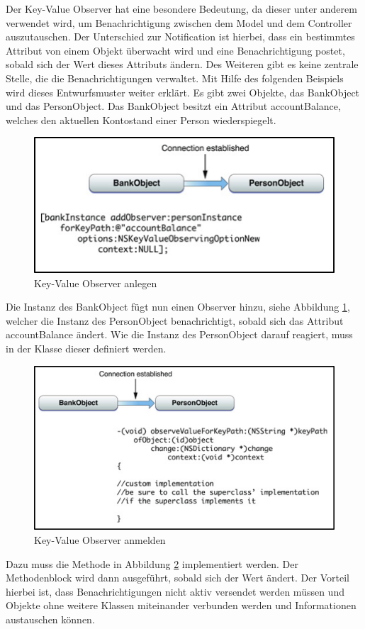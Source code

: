 \documentclass[11pt,a4paper]{report}
\begin{document}
Der Key-Value Observer hat eine besondere Bedeutung, da dieser unter anderem verwendet wird, um Benachrichtigung zwischen dem Model und dem Controller auszutauschen. Der Unterschied zur Notification ist hierbei, dass ein bestimmtes Attribut von einem Objekt überwacht wird und eine Benachrichtigung postet, sobald sich der Wert dieses Attributs ändern. Des Weiteren gibt es keine zentrale Stelle, die die Benachrichtigungen verwaltet. Mit Hilfe des folgenden Beispiels wird dieses Entwurfsmuster weiter erklärt. Es gibt zwei Objekte, das BankObject und das PersonObject. Das BankObject besitzt ein Attribut accountBalance, welches den aktuellen Kontostand einer Person wiederspiegelt.
\begin{figure}[h]
\begin{center}
\includegraphics[scale=1.2]{./images/20.png}
\caption{Key-Value Observer anlegen \cite{KeyValueObserving}}
\label{keyvalue_anlegen}
\end{center}
\end{figure}
Die Instanz des BankObject fügt nun einen Observer hinzu, siehe Abbildung \ref{keyvalue_anlegen}, welcher die Instanz des PersonObject benachrichtigt, sobald sich das Attribut accountBalance ändert. Wie die Instanz des PersonObject darauf reagiert, muss in der Klasse dieser definiert werden.
\begin{figure}[h]
\begin{center}
\includegraphics[scale=1.2]{./images/21.png}
\caption{Key-Value Observer anmelden \cite{KeyValueObserving}}
\label{keyvalue_anmelden}
\end{center}
\end{figure}
Dazu muss die Methode in Abbildung \ref{keyvalue_anmelden} implementiert werden. Der Methodenblock wird dann ausgeführt, sobald sich der Wert ändert. Der Vorteil hierbei ist, dass Benachrichtigungen nicht aktiv versendet werden müssen und Objekte ohne weitere Klassen miteinander verbunden werden und Informationen austauschen können. \cite{KeyValueObserving} \cite{learnios8}
\end{document}
